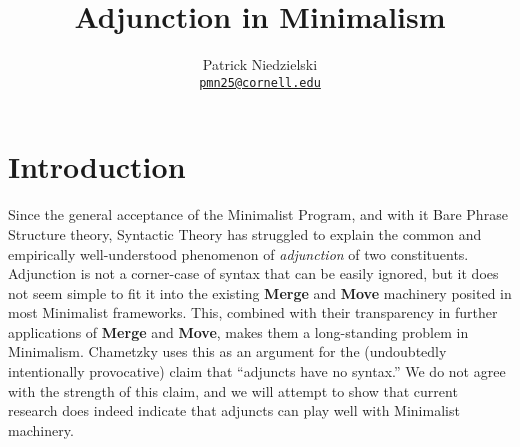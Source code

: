 \documentclass{article}
\begin{document}


\title { Adjunction in Minimalism                                      }
\author{ Patrick Niedzielski \\
  \href{mailto:pmn25@cornell.edu}{\texttt{pmn25@cornell.edu}}          }
\maketitle





\section{Introduction}
\label{sec:introduction}

Since the general acceptance of the Minimalist Program, and with it
Bare Phrase Structure theory, Syntactic Theory has struggled to
explain the common and empirically well-understood phenomenon of
\textit{adjunction} of two constituents.  Adjunction is not a
corner-case of syntax that can be easily ignored, but it does not seem
simple to fit it into the existing \textbf{Merge} and \textbf{Move}
machinery posited in most Minimalist frameworks.  This, combined with
their transparency in further applications of \textbf{Merge} and
\textbf{Move}, makes them a long-standing problem in Minimalism.
Chametzky \cite{chametzky2003} uses this as an argument for the
(undoubtedly intentionally provocative) claim that ``adjuncts have no
syntax.''  We do not agree with the strength of this claim, and we
will attempt to show that current research does indeed indicate that
adjuncts can play well with Minimalist machinery.
\end{document}
